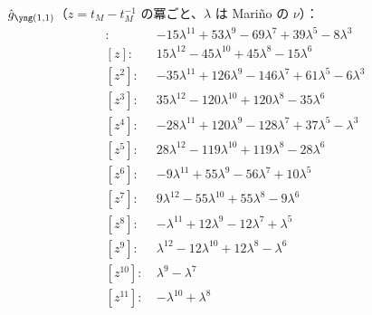 $\hat g_{\yoneone}$（$z = t_M - t_M^{-1}$ の冪ごと、$\lambda$ は Mariño の $\nu$）：
\begin{align*}
[z^{0}]\colon\ & -15 \lambda^{11} +53 \lambda^{9} -69 \lambda^{7} +39 \lambda^{5} -8 \lambda^{3} \\
[z]\colon\ & 15 \lambda^{12} -45 \lambda^{10} +45 \lambda^{8} -15 \lambda^{6} \\
[z^{2}]\colon\ & -35 \lambda^{11} +126 \lambda^{9} -146 \lambda^{7} +61 \lambda^{5} -6 \lambda^{3} \\
[z^{3}]\colon\ & 35 \lambda^{12} -120 \lambda^{10} +120 \lambda^{8} -35 \lambda^{6} \\
[z^{4}]\colon\ & -28 \lambda^{11} +120 \lambda^{9} -128 \lambda^{7} +37 \lambda^{5} -\lambda^{3} \\
[z^{5}]\colon\ & 28 \lambda^{12} -119 \lambda^{10} +119 \lambda^{8} -28 \lambda^{6} \\
[z^{6}]\colon\ & -9 \lambda^{11} +55 \lambda^{9} -56 \lambda^{7} +10 \lambda^{5} \\
[z^{7}]\colon\ & 9 \lambda^{12} -55 \lambda^{10} +55 \lambda^{8} -9 \lambda^{6} \\
[z^{8}]\colon\ & -\lambda^{11} +12 \lambda^{9} -12 \lambda^{7} +\lambda^{5} \\
[z^{9}]\colon\ & \lambda^{12} -12 \lambda^{10} +12 \lambda^{8} -\lambda^{6} \\
[z^{10}]\colon\ & \lambda^{9} -\lambda^{7} \\
[z^{11}]\colon\ & -\lambda^{10} +\lambda^{8}
\end{align*}
